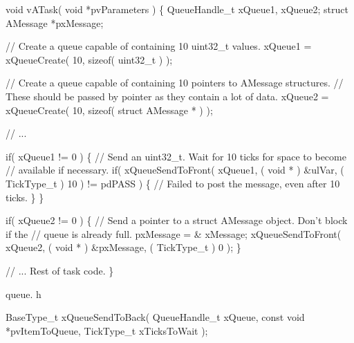 \begin{DoxyPre}void vATask( void *pvParameters )
\{
QueueHandle\_t xQueue1, xQueue2;
struct AMessage *pxMessage;\end{DoxyPre}



\begin{DoxyPre}   // Create a queue capable of containing 10 uint32\_t values.
   xQueue1 = xQueueCreate( 10, sizeof( uint32\_t ) );\end{DoxyPre}



\begin{DoxyPre}   // Create a queue capable of containing 10 pointers to AMessage structures.
   // These should be passed by pointer as they contain a lot of data.
   xQueue2 = xQueueCreate( 10, sizeof( struct AMessage * ) );\end{DoxyPre}



\begin{DoxyPre}   // ...\end{DoxyPre}



\begin{DoxyPre}   if( xQueue1 != 0 )
   \{
    // Send an uint32\_t.  Wait for 10 ticks for space to become
    // available if necessary.
    if( xQueueSendToFront( xQueue1, ( void * ) \&ulVar, ( TickType\_t ) 10 ) != pdPASS )
    \{
        // Failed to post the message, even after 10 ticks.
    \}
   \}\end{DoxyPre}



\begin{DoxyPre}   if( xQueue2 != 0 )
   \{
    // Send a pointer to a struct AMessage object.  Don't block if the
    // queue is already full.
    pxMessage = \& xMessage;
    xQueueSendToFront( xQueue2, ( void * ) \&pxMessage, ( TickType\_t ) 0 );
   \}\end{DoxyPre}



\begin{DoxyPre}   // ... Rest of task code.
\}
\end{DoxyPre}


queue. h 
\begin{DoxyPre}
BaseType\_t xQueueSendToBack(
                               QueueHandle\_t    xQueue,
                               const void       *pvItemToQueue,
                               TickType\_t       xTicksToWait
                           );
  \end{DoxyPre}


